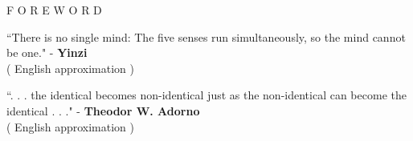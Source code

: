\documentclass[12pt]{article}
\begin{document}
\begingroup
\begin{center}
\end{center}
\endgroup

\vspace{3\baselineskip}

\begingroup
\begin{center}
\huge F O R E W O R D
\end{center}
\endgroup

\vspace{2\baselineskip}

\begingroup
``There is no single mind: The five senses run simultaneously, so the mind cannot be one."
\phantom{text} \hfill - \textbf{Yinzi} \\ \phantom{text} \hfill ( English approximation ) \\
\endgroup

\begingroup
``. . . the identical becomes non-identical just as the non-identical can become
the identical . . ."
\phantom{text} \hfill - \textbf{Theodor W. Adorno} \\ \phantom{text} \hfill ( English approximation )
\endgroup
\end{document}
